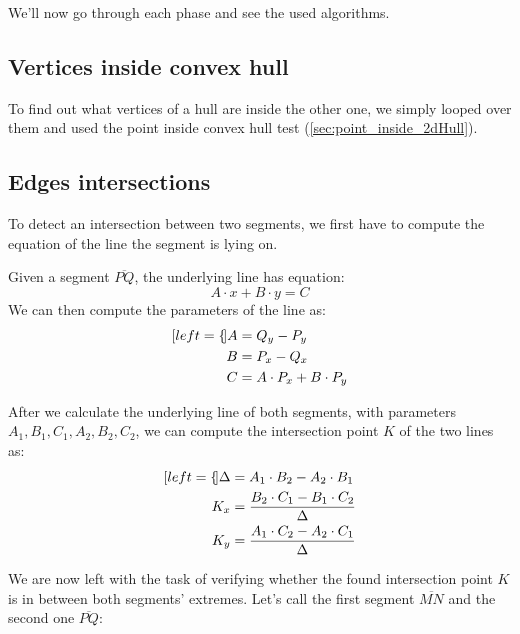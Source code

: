 \documentclass{PoliMi_MasterThesis}
\begin{document}
We'll now go through each phase and see the used algorithms.

\subsection{Vertices inside convex hull}
To find out what vertices of a hull are inside the other one, we simply looped over them and used the point inside convex hull test (\ref{sec:point_inside_2dHull}).

\subsection{Edges intersections}
To detect an intersection between two segments, we first have to compute the equation of the line the segment is lying on.

Given a segment $\overline{PQ}$, the underlying line has equation:
$$A\cdot x + B\cdot y = C$$
We can then compute the parameters of the line as:
\begin{subequations}
	\begin{align*}[left=\empheqlbrace]
		A &= Q_y - P_y\\
		B &= P_x - Q_x\\
		C &= A\cdot P_x + B\cdot P_y
	\end{align*}
\end{subequations}

After we calculate the underlying line of both segments, with parameters $A_1, B_1, C_1, A_2, B_2, C_2$, we can compute the intersection point $K$ of the two lines as:
\begin{subequations}
	\begin{align*}[left=\empheqlbrace]
		\Delta &= A_1 \cdot B_2 - A_2 \cdot B_1\\
		K_x &= \frac{B_2 \cdot C_1 - B_1 \cdot C_2}{\Delta}\\
		K_y &= \frac{A_1 \cdot C_2 - A_2 \cdot C_1}{\Delta}
	\end{align*}
\end{subequations}

We are now left with the task of verifying whether the found intersection point $K$ is in between both segments' extremes. Let's call the first segment $\overline{MN}$ and the second one $\overline{PQ}$:
\end{document}
